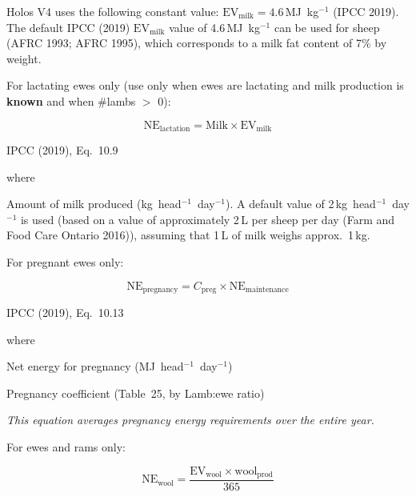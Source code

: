 \noindent Holos V4 uses the following constant value:
$\mathrm{EV}_{\mathrm{milk}} = 4.6$\,MJ~kg$^{-1}$ (IPCC 2019). The default IPCC (2019)
$\mathrm{EV}_{\mathrm{milk}}$ value of 4.6\,MJ~kg$^{-1}$ can be used for sheep
(AFRC 1993; AFRC 1995), which corresponds to a milk fat content of 7\% by weight.

\noindent For lactating ewes only (use only when ewes are lactating and milk
production is \textbf{known} and when \#lambs $>$ 0):

\begin{equation}
    \mathrm{NE}_{\mathrm{lactation}} =
        \mathrm{Milk} \times \mathrm{EV}_{\mathrm{milk}}
    \tag{Eq.\ 3.3.1.6}
\end{equation}

\noindent IPCC (2019), Eq.~10.9

\noindent where
\begin{description}[font=\normalfont, leftmargin=9em, style=sameline, nosep]
    \item[$\mathrm{Milk}$] Amount of milk produced (kg~head$^{-1}$~day$^{-1}$).
          A default value of 2\,kg~head$^{-1}$~day$^{-1}$ is used (based on a value
          of approximately 2\,L per sheep per day (Farm and Food Care Ontario 2016)),
          assuming that 1\,L of milk weighs approx.\ 1\,kg.
\end{description}

\noindent For pregnant ewes only:

\begin{equation}
    \mathrm{NE}_{\mathrm{pregnancy}} =
        C_{\mathrm{preg}} \times \mathrm{NE}_{\mathrm{maintenance}}
    \tag{Eq.\ 3.3.1.7}
\end{equation}

\noindent IPCC (2019), Eq.~10.13

\noindent where
\begin{description}[font=\normalfont, leftmargin=9em, style=sameline, nosep]
    \item[$\mathrm{NE}_{\mathrm{pregnancy}}$] Net energy for pregnancy
          (MJ~head$^{-1}$~day$^{-1}$)
    \item[$C_{\mathrm{preg}}$] Pregnancy coefficient (Table~25, by Lamb:ewe ratio)
\end{description}

\noindent\textit{This equation averages pregnancy energy requirements over the
entire year.}

\noindent For ewes and rams only:

\begin{equation}
    \mathrm{NE}_{\mathrm{wool}} =
        \frac{\mathrm{EV}_{\mathrm{wool}} \times \mathrm{wool}_{\mathrm{prod}}}{365}
    \tag{Eq.\ 3.3.1.8}
\end{equation}

